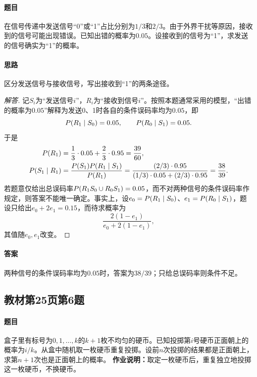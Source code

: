 \paragraph{题目}
在信号传递中发送信号“0”或“1”占比分别为$1/3$和$2/3$。由于外界干扰等原因，接收到的信号可能出现错误。已知出错的概率为$0.05$。设接收到的信号为“1”，求发送的信号确实为“1”的概率。
\paragraph{思路}区分发送信号与接收信号，写出接收到“1”的两条途径。
\begin{proof}[解答]
记$S_i$为“发送信号$i$”，$R_i$为“接收到信号$i$”。按照本题通常采用的模型，“出错的概率为$0.05$”解释为发送0、1时各自的条件误码率均为$0.05$，即
\[
\P(R_1\mid S_0)=0.05,\qquad \P(R_0\mid S_1)=0.05.
\]
于是
\begin{align*}
\P(R_1)&=\frac13\cdot0.05+\frac23\cdot0.95=\frac{39}{60},\\
\P(S_1\mid R_1)&=\frac{\P(S_1)\P(R_1\mid S_1)}{\P(R_1)}
=\frac{(2/3)\cdot0.95}{(1/3)\cdot0.05+(2/3)\cdot0.95}=\frac{38}{39}.
\end{align*}
若题意仅给出总误码率$\P(R_1S_0\cup R_0S_1)=0.05$，而不对两种信号的条件误码率作规定，则答案不能唯一确定。事实上，设$e_0=\P(R_1\mid S_0)$、$e_1=\P(R_0\mid S_1)$，题设只给出$e_0+2e_1=0.15$，而待求概率为
\[
\frac{2(1-e_1)}{e_0+2(1-e_1)},
\]
其值随$e_0,e_1$改变。
\end{proof}
\paragraph{答案}两种信号的条件误码率均为$0.05$时，答案为$38/39$；只给总误码率则条件不足。

\subsection{教材第25页第6题}
\label{ex:w04-t25-6}
\paragraph{题目}
盒子里有标号为$0,1,\ldots,k$的$k+1$枚不均匀的硬币。已知投掷第$i$号硬币正面朝上的概率为$i/k$。从盒中随机取一枚硬币重复投掷。设前$n$次投掷的结果都是正面朝上，求第$n+1$次也是正面朝上的概率。
\textbf{作业说明：}取定一枚硬币后，重复独立地投掷这一枚硬币，不换硬币。
